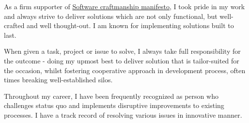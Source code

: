 \documentclass[9pt]{style/developercv}
\begin{document}
\begin{minipage}[t]{0.3\textwidth}
	\vspace{-\baselineskip}


	As a firm supporter of \href{https://manifesto.softwarecraftmanship.org/}{Software craftmanship manifesto},
	I took pride in my work and always strive to deliver solutions which are not only functional, 
	but well-crafted and well thought-out. I am known for implementing solutions built to last.

\end{minipage}
\hfill
\begin{minipage}[t]{0.3\textwidth}
	\vspace{-\baselineskip}
	
	
	When given a task, project or issue to solve, I always take full responsibility for the outcome - doing my upmost
	best to deliver solution that is tailor-suited for the occasion, whilst fostering cooperative approach in development
	process, often times breaking well-established silos.
\end{minipage}
\hfill
\begin{minipage}[t]{0.3\textwidth}
	\vspace{-\baselineskip}
	
	
	Throughout my career, I have been frequently recognized as person who challenges status quo and implements disruptive
	improvements to existing processes. I have a track record of resolving various issues in innovative manner. 
\end{minipage}

\vspace{0.75cm}


\end{document}
